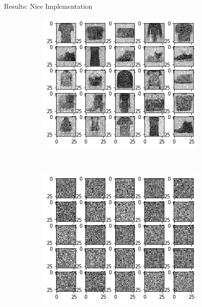 \begin{frame}{Results: Nice Implementation}
\begin{figure}[htbp!]
\begin{subfigure}[b]{0.3\textwidth}
     \end{subfigure}
     \hfill
     \begin{subfigure}[b]{0.3\textwidth}
         \centering
         \includegraphics[width=\textwidth]{Images/fashion1.png}
     \end{subfigure}
     \hfill
     \\
     \begin{subfigure}[b]{0.3\textwidth}
         \centering
         \includegraphics[width=\textwidth]{Images/prior2.png}

\end{subfigure}
\end{figure}
\end{frame}
